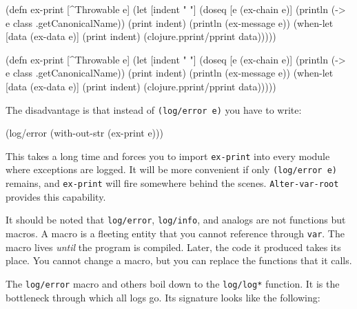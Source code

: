 \begin{english}
  \begin{clojure}
(defn ex-print
  [^Throwable e]
  (let [indent "  "]
    (doseq [e (ex-chain e)]
      (println (-> e
                   class
                   .getCanonicalName))
      (print indent)
      (println (ex-message e))
      (when-let [data (ex-data e)]
        (print indent)
        (clojure.pprint/pprint data)))))
  \end{clojure}
\end{english}

\else

\begin{english}
  \begin{clojure}
(defn ex-print
  [^Throwable e]
  (let [indent "  "]
    (doseq [e (ex-chain e)]
      (println (-> e class .getCanonicalName))
      (print indent)
      (println (ex-message e))
      (when-let [data (ex-data e)]
        (print indent)
        (clojure.pprint/pprint data)))))
  \end{clojure}
\end{english}

\fi

\noindent
The disadvantage is that instead of \verb|(log/error e)| you have to write:

\begin{english}
  \begin{clojure}
(log/error (with-out-str (ex-print e)))
  \end{clojure}
\end{english}

This takes a long time and forces you to import \texttt{ex-\-print} into every module where exceptions are logged.
It will be more convenient if only \verb|(log/error e)| remains, and \verb|ex-print| will fire somewhere behind the scenes.
\texttt{Alter-var\--root} provides this capability.

It should be noted that \verb|log/error|, \verb|log/info|, and analogs are not functions but macros.
A macro is a fleeting entity that you cannot reference through \verb|var|.
The macro lives \emph{until} the program is compiled. Later, the code it produced takes its place. You cannot change a macro, but you can replace the functions that it calls.


The \verb|log/error| macro and others boil down to the \verb|log/log*| function.
It is the bottleneck through which all logs go.
Its signature looks like the following:

